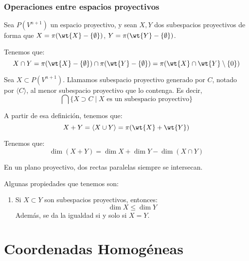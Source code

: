 \subsubsection{Operaciones entre espacios proyectivos}

Sea $P(V^{n+1})$ un espacio proyectivo, y sean $X,Y$ dos subespacios proyectivos de forma que $X=\pi(\wt{X}-\{\emptyset\})$, $Y=\pi(\wt{Y}-\{\emptyset\})$.

Tenemos que:
\begin{equation*}
    X\cap Y = \pi(\wt{X}-\{\emptyset\}) \cap \pi(\wt{Y}-\{\emptyset\}) = \pi(\wt{X}\cap \wt{Y}\setminus \{0\})
\end{equation*}

\begin{definicion}
    Sea $X\subset P(V^{n+1})$. Llamamos subespacio proyectivo generado por $C$, notado por $\langle C \rangle$, al menor subespacio proyectivo que lo contenga. Es decir,
    \begin{equation*}
        \bigcap \{X\supset C\mid X\text{ es un subespacio proyectivo}\}
    \end{equation*}
\end{definicion}

A partir de esa definición, tenemos que:
\begin{equation*}
    X+Y = \langle X\cup Y\rangle = \pi(\wt{X}+\wt{Y})
\end{equation*}


\begin{prop}
    Tenemos que:
    \begin{equation*}
        \dim (X+Y) = \dim X + \dim Y - \dim(X\cap Y)
    \end{equation*}
\end{prop}


\begin{prop}
    En un plano proyectivo, dos rectas paralelas siempre se intersecan.
\end{prop}

Algunas propiedades que tenemos son:
\begin{enumerate}
    \item Si $X\subset Y$ son subespacios proyectivos, entonces:
    \begin{equation*}
        \dim X \leq \dim Y
    \end{equation*}
    Además, se da la igualdad si y solo si $X=Y$.
\end{enumerate}


\section{Coordenadas Homogéneas}

